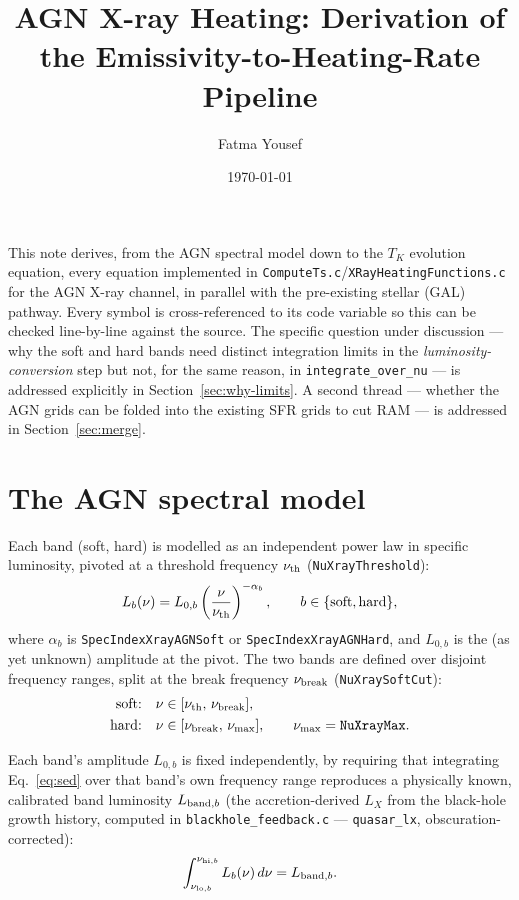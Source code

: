 \documentclass[11pt]{article}
\title{AGN X-ray Heating: Derivation of the Emissivity-to-Heating-Rate Pipeline}
\author{Fatma Yousef}
\date{\today}
\newcommand{\code}[1]{\texttt{#1}}
\begin{document}
\maketitle

\noindent This note derives, from the AGN spectral model down to the $T_K$
evolution equation, every equation implemented in
\code{ComputeTs.c}/\code{XRayHeatingFunctions.c} for the AGN X-ray channel,
in parallel with the pre-existing stellar (GAL) pathway. Every symbol is
cross-referenced to its code variable so this can be checked line-by-line
against the source. The specific question under discussion — why the soft
and hard bands need distinct integration limits in the
\emph{luminosity-conversion} step but not, for the same reason, in
\code{integrate\_over\_nu} — is addressed explicitly in Section~\ref{sec:why-limits}.
A second thread — whether the AGN grids can be folded into the existing SFR
grids to cut RAM — is addressed in Section~\ref{sec:merge}.

\tableofcontents

\section{The AGN spectral model}

Each band (soft, hard) is modelled as an independent power law in
specific luminosity, pivoted at a threshold frequency $\nu_{\rm th}$
(\code{NuXrayThreshold}):
\begin{equation}
  L_b(\nu) = L_{0,b}\left(\frac{\nu}{\nu_{\rm th}}\right)^{-\alpha_b},
  \qquad b \in \{\mathrm{soft, hard}\},
  \label{eq:sed}
\end{equation}
where $\alpha_b$ is \code{SpecIndexXrayAGNSoft} or \code{SpecIndexXrayAGNHard},
and $L_{0,b}$ is the (as yet unknown) amplitude at the pivot. The two bands
are defined over disjoint frequency ranges, split at the break frequency
$\nu_{\rm break}$ (\code{NuXraySoftCut}):
\begin{align}
  \text{soft:} \quad & \nu \in [\nu_{\rm th},\, \nu_{\rm break}], \\
  \text{hard:} \quad & \nu \in [\nu_{\rm break},\, \nu_{\rm max}], \qquad \nu_{\rm max} = \code{NuXrayMax}.
\end{align}

Each band's amplitude $L_{0,b}$ is fixed independently, by requiring that
integrating Eq.~\eqref{eq:sed} over that band's own frequency range
reproduces a physically known, calibrated band luminosity $L_{{\rm band},b}$
(the accretion-derived $L_X$ from the black-hole growth history, computed in
\code{blackhole\_feedback.c} — \code{quasar\_lx}, obscuration-corrected):
\begin{equation}
  \int_{\nu_{{\rm lo},b}}^{\nu_{{\rm hi},b}} L_b(\nu)\,d\nu = L_{{\rm band},b}.
  \label{eq:calibration}
\end{equation}
\end{document}

